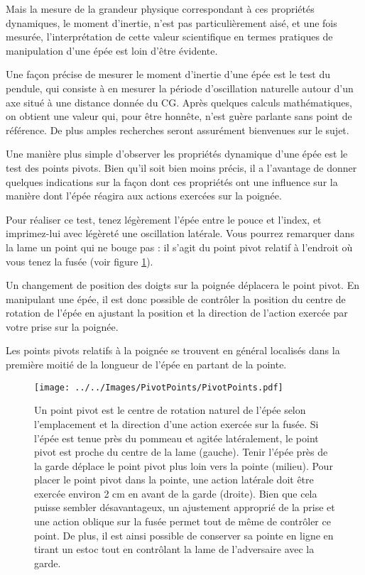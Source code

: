 Mais la mesure de la grandeur physique correspondant à ces propriétés dynamiques, le moment d'inertie, n'est pas particulièrement aisé, et une fois mesurée, l'interprétation de cette valeur scientifique en termes pratiques de manipulation d'une épée est loin d'être évidente.

Une façon précise de mesurer le moment d'inertie d'une épée est le test du pendule, qui consiste à en mesurer la période d'oscillation naturelle autour d'un axe situé à une distance donnée du CG. Après quelques calculs mathématiques, on obtient une valeur qui, pour être honnête, n'est guère parlante sans point de référence. De plus amples recherches seront assurément bienvenues sur le sujet.

Une manière plus simple d'observer les propriétés dynamique d'une épée est le test des points pivots. Bien qu'il soit bien moins précis, il a l'avantage de donner quelques indications sur la façon dont ces propriétés ont une influence sur la manière dont l'épée réagira aux actions exercées sur la poignée.

Pour réaliser ce test, tenez légèrement l'épée entre le pouce et l'index, et imprimez-lui avec légèreté une oscillation latérale. Vous pourrez remarquer dans la lame un point qui ne bouge pas : il s'agit du point pivot relatif à l'endroit où vous tenez la fusée (voir figure \ref{fig:pivot_points}).

Un changement de position des doigts sur la poignée déplacera le point pivot. En manipulant une épée, il est donc possible de contrôler la position du centre de rotation de l'épée en ajustant la position et la direction de l'action exercée par votre prise sur la poignée.

Les points pivots relatifs à la poignée se trouvent en général localisés dans la première moitié de la longueur de l'épée en partant de la pointe.

\begin{figure}[ht]
\centering
	\texttt{[image: ../../Images/PivotPoints/PivotPoints.pdf]}
	\caption[Points pivots]{Un point pivot est le centre de rotation naturel de l'épée selon l'emplacement et la direction d'une action exercée sur la fusée. Si l'épée est tenue près du pommeau et agitée latéralement, le point pivot est proche du centre de la lame (gauche). Tenir l'épée près de la garde déplace le point pivot plus loin vers la pointe (milieu). Pour placer le point pivot dans la pointe, une action latérale doit être exercée environ 2 cm en avant de la garde (droite). Bien que cela puisse sembler désavantageux, un ajustement approprié de la prise et une action oblique sur la fusée permet tout de même de contrôler ce point. De plus, il est ainsi possible de conserver sa pointe en ligne en tirant un estoc tout en contrôlant la lame de l'adversaire avec la garde.}
	\label{fig:pivot_points}
\end{figure}

